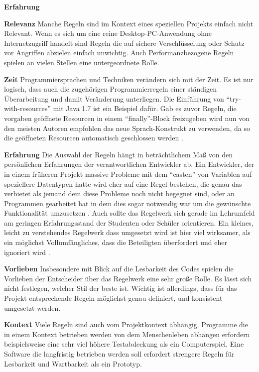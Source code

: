\documentclass[da,ngerman]{stthesis}
\begin{document}
			\begin{labeling}{\textbf{Erfahrung}}
				\item [\textbf{Relevanz}] Manche Regeln sind im Kontext eines speziellen Projekts einfach nicht Relevant. Wenn es sich um eine reine Desktop-PC-Anwendung ohne Internetzugriff handelt sind Regeln die auf sichere Verschlüsselung oder Schutz vor Angriffen abzielen einfach unwichtig. Auch Performanzbezogene Regeln spielen an vielen Stellen eine untergeordnete Rolle. 
				\item [\textbf{Zeit}] Programmiersprachen und Techniken verändern sich mit der Zeit. Es ist nur logisch, dass auch die zugehörigen Programmierregeln einer ständigen Überarbeitung und damit Veränderung unterliegen. Die Einführung von "`try-with-resources"' mit Java 1.7 ist ein Beispiel dafür. Gab es zuvor Regeln, die vorgaben geöffnete Resourcen in einem "`finally"'-Block freizugeben \cite{ElementsOfJavaStyle} wird nun von den meisten Autoren empfohlen das neue Sprach-Konstrukt zu verwenden, da so die geöffneten Resourcen automatisch geschlossen werden \cite{JavaCodingGuidelines}.
				\item [\textbf{Erfahrung}] Die Auswahl der Regeln hängt in beträchtlichem Maß von den persönlichen Erfahrungen der verantwortlichen Entwickler ab. Ein Entwickler, der in einem früheren Projekt massive Probleme mit dem "`casten"' von Variablen auf speziellere Datentypen hatte wird eher auf eine Regel bestehen, die genau das verbietet als jemand dem diese Probleme noch nicht begegnet sind, oder an Programmen gearbeitet hat in dem dies sogar notwendig war um die gewünschte Funktionalität umzusetzen \cite{JavaQualityAssurance}. Auch sollte das Regelwerk sich gerade im Lehrumfeld am geringen Erfahrungsstand der Studenten oder Schüler orientieren. Ein kleines, leicht zu verstehendes Regelwerk dass umgesetzt wird ist hier viel wirksamer, als ein möglichst Vollumfängliches, dass die Beteiligten überfordert und eher ignoriert wird \cite{CleanCodeImPraktikum}.
				  \item [\textbf{Vorlieben}] Insbesondere mit Blick auf die Lesbarkeit des Codes spielen die Vorlieben der Entscheider über das Regelwerk eine sehr große Rolle. Es lässt sich nicht festlegen, welcher Stil der beste ist. Wichtig ist allerdings, dass für das Projekt entsprechende Regeln möglichst genau definiert, und konsistent umgesetzt werden. 
				  \item [\textbf{Kontext}] Viele Regeln sind auch vom Projektkontext abhängig. Programme die in einem Kontext betrieben werden von dem Menschenleben abhängen erfordern beispielsweise eine sehr viel höhere Testabdeckung als ein Computerspiel. Eine Software die langfristig betrieben werden soll erfordert strengere Regeln für Lesbarkeit und Wartbarkeit als ein Prototyp.  

\end{labeling}
\end{document}
